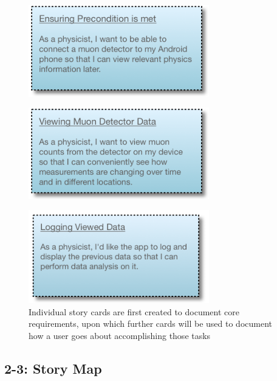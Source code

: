 \documentclass[11pt,a4paper]{article}
\begin{document}
\begin{figure}[h]
  \centering
  
      \includegraphics[width=0.7\textwidth]{storycard1.png}
  
\end{figure}

\begin{figure}[h]
  \centering
  
      \includegraphics[width=0.7\textwidth]{storycard2.png}
     
  
\end{figure}

\begin{figure}[h]
  \centering
  
      \includegraphics[width=0.7\textwidth]{storycard3.png}
      \caption{Individual story cards are first created to document core requirements, upon which further cards will be used to document how a user goes about accomplishing those tasks}
  
\end{figure}


\subsection*{2-3: Story Map}
\end{document}
